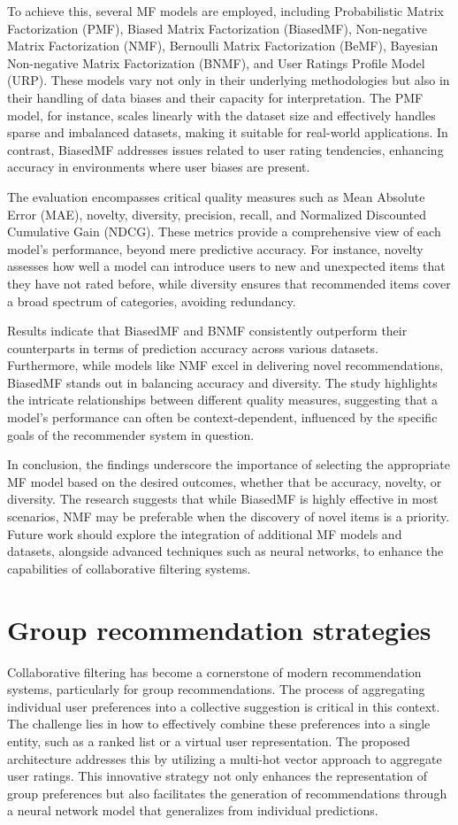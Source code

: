 \documentclass[runningheads]{llncs}
\begin{document}
To achieve this, several MF models are employed, including Probabilistic Matrix Factorization (PMF), Biased Matrix Factorization (BiasedMF), Non-negative Matrix Factorization (NMF), Bernoulli Matrix Factorization (BeMF), Bayesian Non-negative Matrix Factorization (BNMF), and User Ratings Profile Model (URP). These models vary not only in their underlying methodologies but also in their handling of data biases and their capacity for interpretation. The PMF model, for instance, scales linearly with the dataset size and effectively handles sparse and imbalanced datasets, making it suitable for real-world applications. In contrast, BiasedMF addresses issues related to user rating tendencies, enhancing accuracy in environments where user biases are present. 

The evaluation encompasses critical quality measures such as Mean Absolute Error (MAE), novelty, diversity, precision, recall, and Normalized Discounted Cumulative Gain (NDCG). These metrics provide a comprehensive view of each model's performance, beyond mere predictive accuracy. For instance, novelty assesses how well a model can introduce users to new and unexpected items that they have not rated before, while diversity ensures that recommended items cover a broad spectrum of categories, avoiding redundancy. 

Results indicate that BiasedMF and BNMF consistently outperform their counterparts in terms of prediction accuracy across various datasets. Furthermore, while models like NMF excel in delivering novel recommendations, BiasedMF stands out in balancing accuracy and diversity. The study highlights the intricate relationships between different quality measures, suggesting that a model's performance can often be context-dependent, influenced by the specific goals of the recommender system in question. 

In conclusion, the findings underscore the importance of selecting the appropriate MF model based on the desired outcomes, whether that be accuracy, novelty, or diversity. The research suggests that while BiasedMF is highly effective in most scenarios, NMF may be preferable when the discovery of novel items is a priority. Future work should explore the integration of additional MF models and datasets, alongside advanced techniques such as neural networks, to enhance the capabilities of collaborative filtering systems.
\section{Group recommendation strategies}
Collaborative filtering has become a cornerstone of modern recommendation systems, particularly for group recommendations. The process of aggregating individual user preferences into a collective suggestion is critical in this context. The challenge lies in how to effectively combine these preferences into a single entity, such as a ranked list or a virtual user representation. The proposed architecture addresses this by utilizing a multi-hot vector approach to aggregate user ratings. This innovative strategy not only enhances the representation of group preferences but also facilitates the generation of recommendations through a neural network model that generalizes from individual predictions.
\end{document}
